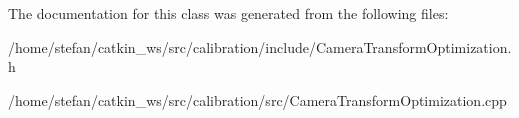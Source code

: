 \-The documentation for this class was generated from the following files\-:\begin{DoxyCompactItemize}
\item 
/home/stefan/catkin\-\_\-ws/src/calibration/include/\-Camera\-Transform\-Optimization.\-h\item 
/home/stefan/catkin\-\_\-ws/src/calibration/src/\-Camera\-Transform\-Optimization.\-cpp\end{DoxyCompactItemize}
